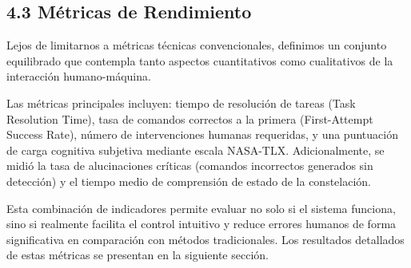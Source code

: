 \subsection{4.3 Métricas de Rendimiento}

Lejos de limitarnos a métricas técnicas convencionales, definimos un conjunto equilibrado que contempla tanto aspectos cuantitativos como cualitativos de la interacción humano-máquina.

Las métricas principales incluyen: tiempo de resolución de tareas (Task Resolution Time), tasa de comandos correctos a la primera (First-Attempt Success Rate), número de intervenciones humanas requeridas, y una puntuación de carga cognitiva subjetiva mediante escala NASA-TLX. Adicionalmente, se midió la tasa de alucinaciones críticas (comandos incorrectos generados sin detección) y el tiempo medio de comprensión de estado de la constelación.

Esta combinación de indicadores permite evaluar no solo si el sistema funciona, sino si realmente facilita el control intuitivo y reduce errores humanos de forma significativa en comparación con métodos tradicionales. Los resultados detallados de estas métricas se presentan en la siguiente sección.